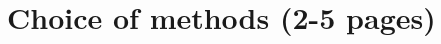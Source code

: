 \documentclass[informationsecurity]{gucmasterproject}
\begin{document}
%
%
%
%
%
%
%

\chapter{Choice of methods (2-5 pages)}
\end{document}

